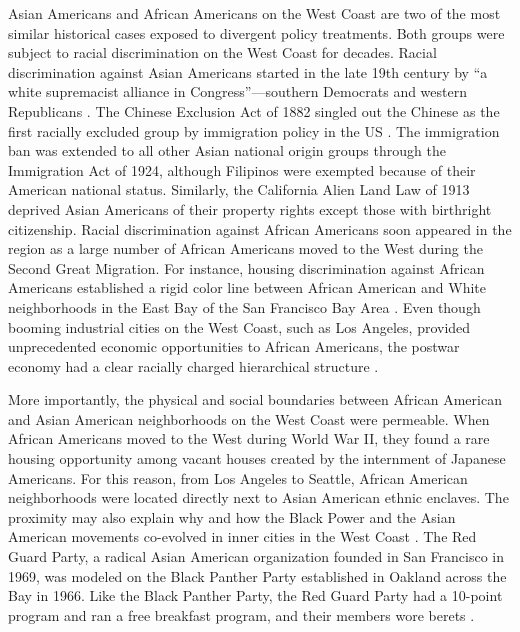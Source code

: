 \documentclass[12 pt]{article}
\begin{document}
Asian Americans and African Americans on the West Coast are two of the most similar historical cases exposed to divergent policy treatments. Both groups were subject to racial discrimination on the West Coast for decades. Racial discrimination against Asian Americans started in the late 19th century by “a white supremacist alliance in Congress”---southern Democrats and western Republicans \citep[88]{king2005racial}. The Chinese Exclusion Act of 1882 singled out the Chinese as the first racially excluded group by immigration policy in the US \citep{lee2003america, ngai2014impossible}. The immigration ban was extended to all other Asian national origin groups through the Immigration Act of 1924, although Filipinos were exempted because of their American national status. Similarly, the California Alien Land Law of 1913 deprived Asian Americans of their property rights except those with birthright citizenship. Racial discrimination against African Americans soon appeared in the region as a large number of African Americans moved to the West during the Second Great Migration. For instance, housing discrimination against African Americans established a rigid color line between African American and White neighborhoods in the East Bay of the San Francisco Bay Area \citep{self2005american}. Even though booming industrial cities on the West Coast, such as Los Angeles, provided unprecedented economic opportunities to African Americans, the postwar economy had a clear racially charged hierarchical structure \citep{sides2006city}. 

More importantly, the physical and social boundaries between African American and Asian American neighborhoods on the West Coast were permeable. When African Americans moved to the West during World War II, they found a rare housing opportunity among vacant houses created by the internment of Japanese Americans. For this reason, from Los Angeles to Seattle, African American neighborhoods were located directly next to Asian American ethnic enclaves. The proximity may also explain why and how the Black Power and the Asian American movements co-evolved in inner cities in the West Coast \citep{prashad2002everybody, maeda2005black, ho2008afro, maeda2012rethinking, ishizuka2016serve, watkins2012black}. The Red Guard Party, a radical Asian American organization founded in San Francisco in 1969, was modeled on the Black Panther Party established in Oakland across the Bay in 1966. Like the Black Panther Party, the Red Guard Party had a 10-point program and ran a free breakfast program, and their members wore berets \citep[1079-1089]{maeda2005black}. 
\end{document}
